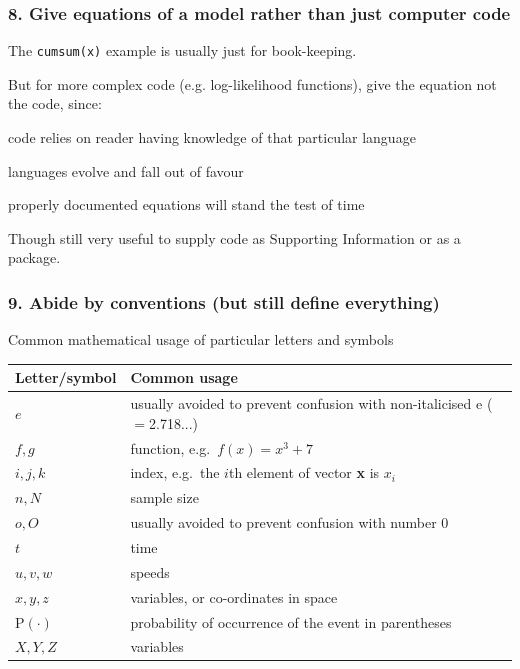 \begin{frame}
\frametitle{8. Give equations of a model rather than just computer code}

The {\tt cumsum(x)} example is usually just for book-keeping.

\medskip

But for more complex code (e.g. log-likelihood functions), give the equation not
the code, since:
\bi
\item code relies on reader having knowledge of that particular language
\item languages evolve and fall out of favour
\item properly documented equations will stand the test of time
\ei

\medskip

Though still very useful to supply code as Supporting Information or as a package.

\end{frame}


\begin{frame}
\frametitle{9. Abide by conventions (but still define everything)}

\centering Common mathematical usage of particular letters and symbols
\begin{table}
  \centering{}
  \begin{tabular}{ll}
\hline
Letter/symbol & Common usage\\
\hline
$e$ & usually avoided to prevent confusion with non-italicised e ($=$2.718...)\\
$f, g$ & function, e.g.~$f(x) = x^3 + 7$\\
$i, j, k$ & index, e.g.~the $i$th element of vector {\bf x} is $x_i$\\
$n, N$ & sample size\\
$o, O$ & usually avoided to prevent confusion with number 0\\
$t$ & time\\
$u, v, w$ & speeds\\
$x, y, z$ & variables, or co-ordinates in space\\
\mbox{P}$(\cdot)$ & probability of occurrence of the event in parentheses\\
$X, Y, Z$ & variables\\
\hline
\end{tabular}
\end{table}

\end{frame}

